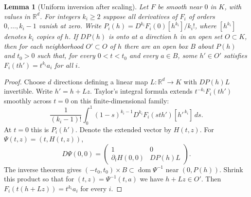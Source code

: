 \documentclass[11pt,letterpaper]{article}
\newtheorem{lemma}[theorem]{Lemma}
\newcommand{\R}{\mathbb R}
\begin{document}
\begin{lemma}[Uniform inversion after scaling]\label{scaled-box}
Let $F$ be smooth near $0$ in $K$, with values in $\R^d$. For integers
$k_i\ge2$ suppose all derivatives of $F_i$ of orders $0,\ldots,k_i-1$
vanish at zero. Write $P_i(h)=D^{k_i}F_i(0)[h^{k_i}]/k_i!$, where
$[h^{k_i}]$ denotes $k_i$ copies of $h$. If $DP(h)$ is onto at a
direction $h$ in an open set $O\subset K$, then for each neighborhood
$O'\subset O$ of $h$ there are an open box $B$ about $P(h)$ and $t_0>0$
such that, for every $0<t<t_0$ and every $a\in B$, some $h'\in O'$
satisfies $F_i(th')=t^{k_i}a_i$ for all $i$.
\end{lemma}
\begin{proof}
Choose $d$ directions defining a linear map $L:\R^d\to K$ with
$DP(h)L$ invertible. Write $h'=h+Lz$. Taylor's integral formula extends
$t^{-k_i}F_i(t h')$ smoothly across $t=0$ on this finite-dimensional family:
\[
 \frac1{(k_i-1)!}\int_0^1(1-s)^{k_i-1}
       D^{k_i}F_i(sth')[h'^{\,k_i}]\,ds .
\]
At $t=0$ this is $P_i(h')$. Denote the extended vector by $H(t,z)$.
For $\Psi(t,z)=(t,H(t,z))$,
\[
 D\Psi(0,0)=
 \begin{pmatrix}1&0\\ \partial_t H(0,0)&DP(h)L\end{pmatrix}.
\]
The inverse theorem gives $(-t_0,t_0)\times B\subset\operatorname{dom}\Psi^{-1}$
near $(0,P(h))$. Shrink this product so that for $(t,z)=\Psi^{-1}(t,a)$
we have $h+Lz\in O'$. Then $F_i(t(h+Lz))=t^{k_i}a_i$ for every $i$.
\end{proof}
\end{document}
